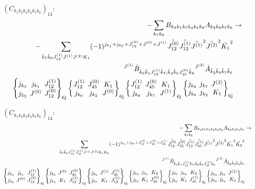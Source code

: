 \documentclass[11pt]{article}
\newcommand{\sixj}[6]{\begingroup\setlength{\arraycolsep}{0.2em}\begin{Bmatrix} #1 & #2 & #3 \\ #4 & #5 & #6 \end{Bmatrix}_{\text{6j}}\endgroup}
\begin{document}
$\left({C}_{{k}_{1}{k}_{2}{k}_{3}{k}_{4}{k}_{5}{k}_{6}}\right)_{13}$:
\begin{align}
-\sum_{{k}_{7}{k}_{8}}{B}_{{k}_{3}{k}_{1}{k}_{7}{k}_{4}{k}_{5}{k}_{8}}{A}_{{k}_{2}{k}_{8}{k}_{7}{k}_{6}}&\rightarrow \notag \\-\sum_{\tilde{k}_{7}\tilde{k}_{8}J^{(1)}_{12}J^{(1)}J^{(2)}K_{1}}(-1)^{j_{{k}_{1}} +j_{{k}_{7}} +J^{(0)}_{12} +J^{(0)} +J^{(1)} }\hat{J^{(0)}_{12}}\hat{J^{(1)}_{12}}\hat{J^{(1)}}^{2}\hat{J^{(2)}}^{2}\hat{K_{1}}^{2}& \notag \\{}^{J^{(1)}}\tilde{B}_{\tilde{k}_{3}\tilde{k}_{1}J^{(1)}_{12}\tilde{k}_{7};\tilde{k}_{4}\tilde{k}_{5}J^{(0)}_{45}\tilde{k}_{8}}{}^{J^{(2)}}\tilde{A}_{\tilde{k}_{2}\tilde{k}_{8}\tilde{k}_{7}\tilde{k}_{6}}& \notag \\\sixj{j_{{k}_{3}}}{j_{{k}_{1}}}{J^{(1)}_{12}}{j_{{k}_{2}}}{J^{(0)}}{J^{(0)}_{12}}\sixj{J^{(1)}_{12}}{J^{(0)}_{45}}{K_{1}}{j_{{k}_{6}}}{j_{{k}_{2}}}{J^{(0)}}\sixj{J^{(1)}_{12}}{J^{(0)}_{45}}{K_{1}}{j_{{k}_{8}}}{j_{{k}_{7}}}{J^{(1)}}\sixj{j_{{k}_{6}}}{j_{{k}_{7}}}{J^{(2)}}{j_{{k}_{8}}}{j_{{k}_{2}}}{K_{1}}
\end{align}

$\left({C}_{{k}_{1}{k}_{2}{k}_{3}{k}_{4}{k}_{5}{k}_{6}}\right)_{14}$:
\begin{align}
-\sum_{{k}_{7}{k}_{8}}{B}_{{k}_{3}{k}_{1}{k}_{7}{k}_{8}{k}_{5}{k}_{6}}{A}_{{k}_{8}{k}_{2}{k}_{4}{k}_{7}}&\rightarrow \notag \\\sum_{\tilde{k}_{7}\tilde{k}_{8}J^{(1)}_{12}J^{(1)}_{45}J^{(1)}J^{(2)}K_{1}K_{2}}(-1)^{j_{{k}_{1}} +j_{{k}_{7}} +J^{(0)}_{12} +J^{(0)}_{45} +J^{(1)}_{45} }\hat{J^{(0)}_{12}}\hat{J^{(0)}_{45}}\hat{J^{(1)}_{12}}\hat{J^{(1)}_{45}}\hat{J^{(1)}}^{2}\hat{J^{(2)}}^{2}\hat{K_{1}}^{2}\hat{K_{2}}^{2}& \notag \\{}^{J^{(1)}}\tilde{B}_{\tilde{k}_{3}\tilde{k}_{1}J^{(1)}_{12}\tilde{k}_{7};\tilde{k}_{8}\tilde{k}_{5}J^{(1)}_{45}\tilde{k}_{6}}{}^{J^{(2)}}\tilde{A}_{\tilde{k}_{8}\tilde{k}_{2}\tilde{k}_{4}\tilde{k}_{7}}& \notag \\\sixj{j_{{k}_{3}}}{j_{{k}_{1}}}{J^{(1)}_{12}}{j_{{k}_{2}}}{J^{(0)}}{J^{(0)}_{12}}\sixj{j_{{k}_{6}}}{J^{(0)}}{J^{(0)}_{45}}{j_{{k}_{2}}}{K_{1}}{J^{(1)}_{12}}\sixj{j_{{k}_{6}}}{J^{(1)}}{J^{(1)}_{45}}{j_{{k}_{7}}}{K_{1}}{J^{(1)}_{12}}\sixj{j_{{k}_{2}}}{j_{{k}_{4}}}{K_{2}}{j_{{k}_{5}}}{K_{1}}{J^{(0)}_{45}}\sixj{j_{{k}_{7}}}{j_{{k}_{8}}}{K_{2}}{j_{{k}_{5}}}{K_{1}}{J^{(1)}_{45}}\sixj{j_{{k}_{4}}}{j_{{k}_{7}}}{J^{(2)}}{j_{{k}_{8}}}{j_{{k}_{2}}}{K_{2}}
\end{align}
\end{document}
